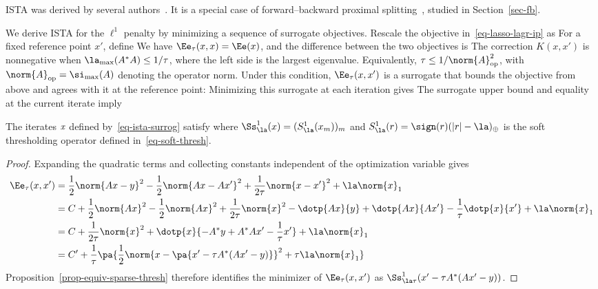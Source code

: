 ISTA was derived by several authors~\cite{figueiredo-nowak-em,daubechies-iterated}. It is a special case of forward--backward proximal splitting~\cite{combettes-proximal}, studied in Section~\ref{sec-fb}.

We derive ISTA for the $\ell^1$ penalty by minimizing a sequence of surrogate objectives.
%
Rescale the objective in~\eqref{eq-lasso-lagr-ip} as
For a fixed reference point $x'$, define
We have $\Ee_\tau(x,x)=\Ee(x)$, and the difference between the two objectives is
The correction $K(x,x')$ is nonnegative when $\la_{\max}(A^*A) \leq 1/\tau$, where the left side is the largest eigenvalue. Equivalently, $\tau \leq 1/\norm{A}_{\text{op}}^2$, with $\norm{A}_{\text{op}} = \si_{\max}(A)$ denoting the operator norm.
%
Under this condition, $\Ee_\tau(x,x')$ is a surrogate that bounds the objective from above and agrees with it at the reference point:
Minimizing this surrogate at each iteration gives
The surrogate upper bound and equality at the current iterate imply

\begin{prop}
	The iterates $\it{x}$ defined by~\eqref{eq-ista-surrog} satisfy
	where $\Ss^1_\la(x) = (  S^1_\la(x_m) )_m$ and $S^1_\la(r) = \sign(r) (|r|-\la)_\oplus$ is the soft thresholding operator defined in~\eqref{eq-soft-thresh}.
\end{prop}
\begin{proof}
    Expanding the quadratic terms and collecting constants independent of the optimization variable gives
	\begin{align*}
		\Ee_\tau(x,x') &= \frac{1}{2}\norm{Ax-y}^2 - \frac{1}{2}\norm{Ax-Ax'}^2 + \frac{1}{2\tau}\norm{x-x'}^2 + \la \norm{x}_1 \\
			& = C + \frac{1}{2}\norm{Ax}^2-\frac{1}{2}\norm{Ax}^2+\frac{1}{2\tau}\norm{x}^2
			- \dotp{Ax}{y} + \dotp{Ax}{Ax'} - \frac{1}{\tau}\dotp{x}{x'}
			+ \la \norm{x}_1 \\
			& = C + \frac{1}{2\tau}\norm{x}^2 + \dotp{x}{ -A^*y+A^*Ax'-\frac{1}{\tau}x' } + \la \norm{x}_1 \\
			&= C' + \frac{1}{\tau} \pa{
				\frac12\norm{ x - \pa{ x'-\tau A^*(Ax'-y) } }^2 + \tau \la \norm{x}_1
			}
	\end{align*}
    Proposition~\ref{prop-equiv-sparse-thresh} therefore identifies the minimizer of $\Ee_\tau(x,x')$ as
    $\Ss^1_{\la\tau}( x' - \tau A^*( A x' - y ) )$.
\end{proof}

